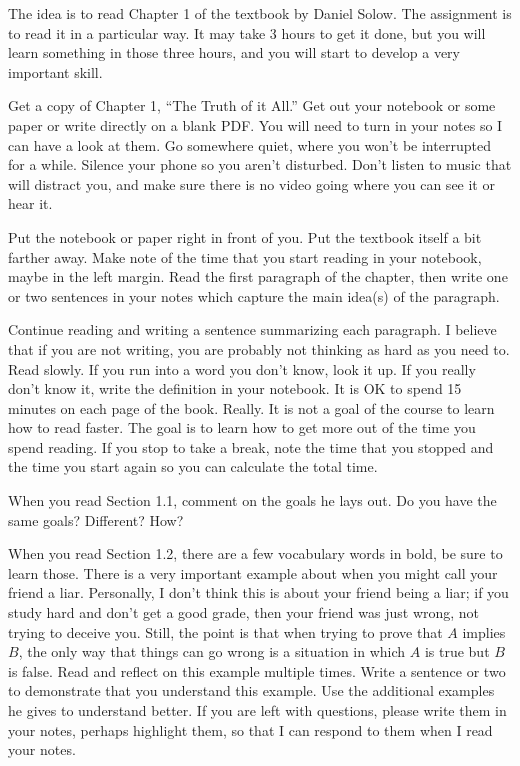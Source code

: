 
\parskip 0.05in

The idea is to read Chapter 1 of the textbook by Daniel Solow.
The assignment is to read it in a particular way.
It may take 3 hours to get it done, but you will learn something in those three hours, and you will start to develop a very important skill.

Get a copy of Chapter 1, ``The Truth of it All.''
Get out your notebook or some paper or write directly on a blank PDF.
You will need to turn in your notes so I can have a look at them.
Go somewhere quiet, where you won't be interrupted for a while.
Silence your phone so you aren't disturbed.
Don't listen to music that will distract you, and make sure there is no video going where you can see it or hear it.

Put the notebook or paper right in front of you.
Put the textbook itself a bit farther away.
Make note of the time that you start reading in your notebook, maybe in the left margin.
Read the first paragraph of the chapter, then write one or two sentences in your notes which capture the main idea(s) of the paragraph.

Continue reading and writing a sentence summarizing each paragraph.
I believe that if you are not writing, you are probably not thinking as hard as you need to.
Read slowly.
If you run into a word you don't know, look it up.  
If you really don't know it, write the definition in your notebook.
It is OK to spend 15 minutes on each page of the book.  Really.
It is not a goal of the course to learn how to read faster.
The goal is to learn how to get more out of the time you spend reading.
If you stop to take a break, note the time that you stopped and the time you start again so you can calculate the total time.

When you read Section 1.1, comment on the goals he lays out.  Do you have the same goals?  Different?  How?

When you read Section 1.2, there are a few vocabulary words in bold, be sure to learn those.
There is a very important example about when you might call your friend a liar.
Personally, I don't think this is about your friend being a liar; if you study hard and don't get a good grade, then your friend was just wrong, not trying to deceive you.
Still, the point is that when trying to prove that $A$ implies $B$, the only way that things can go wrong is a situation in which $A$ is true but $B$ is false.
Read and reflect on this example multiple times.
Write a sentence or two to demonstrate that you understand this example.
Use the additional examples he gives to understand better.
If you are left with questions, please write them in your notes, perhaps highlight them, so that I can respond to them when I read your notes.

